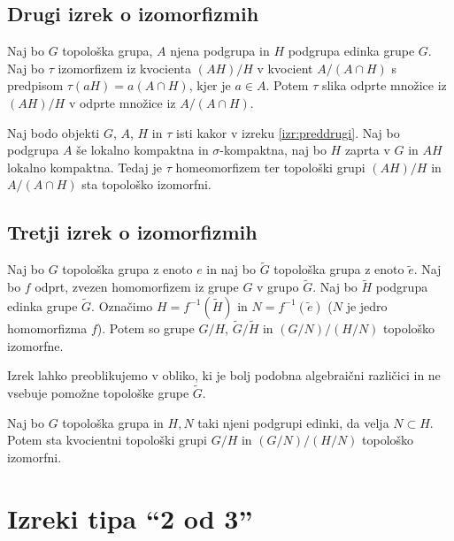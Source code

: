 \documentclass[mat1]{fmfdelo}
\begin{document}
\subsection{Drugi izrek o izomorfizmih}
\begin{izrek}\label{izr:preddrugi}
Naj bo $G$ topološka grupa, $A$ njena podgrupa in $H$ podgrupa edinka grupe $G$. Naj bo $\tau$ izomorfizem iz kvocienta $(AH)/H$ v kvocient $A/(A \cap H)$ s predpisom $\tau (aH) = a(A \cap H)$, kjer je $a \in A$. Potem $\tau$ slika odprte množice iz $(AH)/H$ v odprte množice iz $A/(A \cap H)$.
\end{izrek}

\begin{izrek}\label{izr:drugitopizrek}
Naj bodo objekti $G$, $A$, $H$ in $\tau$ isti kakor v izreku \ref{izr:preddrugi}. Naj bo podgrupa $A$ še lokalno kompaktna in $\sigma$-kompaktna, naj bo $H$ zaprta v $G$ in $AH$ lokalno kompaktna. Tedaj je $\tau$ homeomorfizem ter topološki grupi $(AH)/H$ in $A/(A \cap H)$ sta topološko izomorfni.
\end{izrek}


\subsection{Tretji izrek o izomorfizmih}
\begin{izrek}\label{izr:predtretji}
Naj bo $G$ topološka grupa z enoto $e$ in naj bo $\widetilde{G}$ topološka grupa z enoto $\tilde{e}$. Naj bo $f$ odprt, zvezen homomorfizem iz grupe $G$ v grupo $\widetilde{G}$. Naj bo $\widetilde{H}$ podgrupa edinka grupe $\widetilde{G}$. Označimo $H = f^{-1}(\widetilde{H})$ in $N = f^{-1}(\tilde{e})$ ($N$ je jedro homomorfizma $f$). Potem so grupe $G/H$, $\widetilde{G}/\widetilde{H}$ in $(G/N)/(H/N)$ topološko izomorfne.
\end{izrek}

Izrek lahko preoblikujemo v obliko, ki je bolj podobna algebraični različici in ne vsebuje pomožne topološke grupe $\widetilde{G}$.
\begin{izrek}\label{izr:tretjitopizrek}
Naj bo $G$ topološka grupa in $H,N$ taki njeni podgrupi edinki, da velja $N \subset H$. Potem sta kvocientni topološki grupi $G/H$ in $(G/N)/(H/N)$ topološko izomorfni.
\end{izrek}

\section{Izreki tipa ``2 od 3''}
\end{document}

